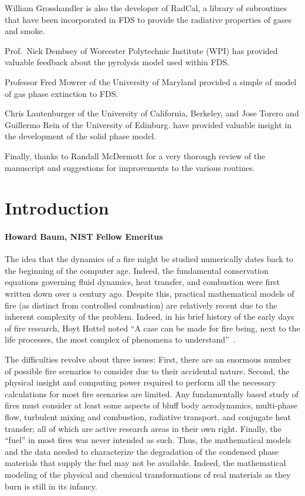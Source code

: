 \documentclass[11pt]{book}
\begin{document}
William Grosshandler is also the developer of RadCal, a library of
subroutines that have been incorporated in FDS to provide the
radiative properties of gases and smoke.

Prof.~Nick Dembsey of Worcester Polytechnic Institute (WPI) has provided valuable feedback about the pyrolysis model used within FDS.

Professor Fred Mowrer of the University of Maryland provided a simple
of model of gas phase extinction to FDS.

Chris Lautenburger of the University of California, Berkeley, and Jose Torero and Guillermo Rein of the University of Edinburg. have
provided valuable insight in the development of the solid phase model.



Finally, thanks to Randall McDermott for a very thorough review of the manuscript and suggestions for improvements
to the various routines.









\tableofcontents

\mainmatter


\chapter{Introduction}
\subsubsection{Howard Baum, NIST Fellow Emeritus}

The idea that the dynamics of a fire might be studied numerically dates back
to the beginning of the computer age. Indeed, the fundamental
conservation equations governing fluid dynamics, heat transfer, and
combustion were first written down over a century ago.
Despite this, practical mathematical models of fire
(as distinct from controlled combustion) are relatively recent due
to the inherent complexity of the problem.
Indeed, in his brief history of the early days of fire research,
Hoyt Hottel noted ``A case can be made for fire being,
next to the life processes, the most complex of phenomena to understand''~\cite{Hottel:1}.

The difficulties revolve about three issues:
First, there are an enormous number of possible fire scenarios
to consider due to their accidental nature. Second, the physical
insight and computing power required to perform all the necessary calculations
for most fire scenarios are limited. Any fundamentally based study of fires
must consider at least some aspects of bluff body aerodynamics, multi-phase flow,
turbulent mixing and combustion, radiative transport, and conjugate heat transfer;
all of which are active research areas in their own right.
Finally, the ``fuel'' in most fires was never intended as such.
Thus, the mathematical models and the data needed to characterize the
degradation of the condensed phase materials that supply the fuel may not be available.
Indeed, the mathematical modeling of the physical and
chemical transformations of real materials as they burn is still in its infancy.
\end{document}

